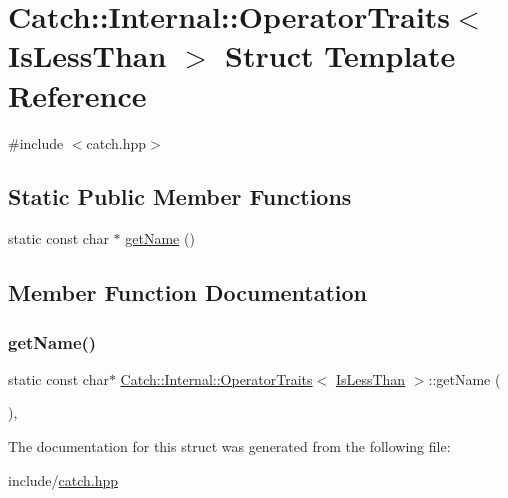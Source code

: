 \hypertarget{struct_catch_1_1_internal_1_1_operator_traits_3_01_is_less_than_01_4}{}\section{Catch\+:\+:Internal\+:\+:Operator\+Traits$<$ Is\+Less\+Than $>$ Struct Template Reference}
\label{struct_catch_1_1_internal_1_1_operator_traits_3_01_is_less_than_01_4}


{\ttfamily \#include $<$catch.\+hpp$>$}

\subsection*{Static Public Member Functions}
\begin{DoxyCompactItemize}
\item 
static const char $\ast$ \mbox{\hyperlink{struct_catch_1_1_internal_1_1_operator_traits_3_01_is_less_than_01_4_aa3b536ddbd2e34b1253931ff00c32712}{get\+Name}} ()
\end{DoxyCompactItemize}


\subsection{Member Function Documentation}
\mbox{\label{struct_catch_1_1_internal_1_1_operator_traits_3_01_is_less_than_01_4_aa3b536ddbd2e34b1253931ff00c32712}} 
\subsubsection{\texorpdfstring{get\+Name()}{getName()}}
{\footnotesize\ttfamily static const char$\ast$ \mbox{\hyperlink{struct_catch_1_1_internal_1_1_operator_traits}{Catch\+::\+Internal\+::\+Operator\+Traits}}$<$ \mbox{\hyperlink{namespace_catch_1_1_internal_ae3f96598a7858155750bf38e7295d83eabbbfc41706595e50acbefa8408004b93}{Is\+Less\+Than}} $>$\+::get\+Name (\begin{DoxyParamCaption}{ }\end{DoxyParamCaption})\hspace{0.3cm}{\ttfamily [inline]}, {\ttfamily [static]}}



The documentation for this struct was generated from the following file\+:\begin{DoxyCompactItemize}
\item 
include/\mbox{\hyperlink{catch_8hpp}{catch.\+hpp}}\end{DoxyCompactItemize}
